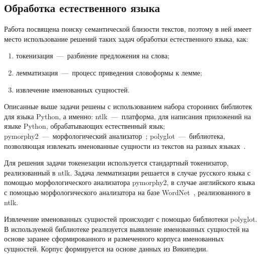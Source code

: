 \subsection{Обработка естественного языка}
\label{subsubsec:lemma}
    Работа посвящена поиску семантической близости текстов, поэтому в ней имеет место использование решений таких задач обработки естественного языка, как:
    \begin{enumerate}
        \item токенизация~---~разбиение предложения на слова;
        \item лемматизация~---~процесс приведения словоформы к лемме;
        \item извлечение именованных сущностей.
    \end{enumerate}
    Описанные выше задачи решены с использованием набора сторонних библиотек для языка Python, а именно:
    ntlk~---~платформа, для написания приложений на языке Python, обрабатывающих естественный язык;
    pymorphy2~---~морфологический анализатор~\cite{pymorphy};
    polyglot~---~библиотека, позволяющая извлекать именованные сущности из текстов на разных языках~\cite{polyglot}.

    Для решения задачи токенезации используется стандартный токенизатор, реализованный в ntlk.
    Задача лемматизации решается в случае русского языка с помощью морфологического анализатора pymorphy2,
    в случае английского языка с помощью морфологического анализатора на базе WordNet~\cite{wordnet}, реализованного в ntlk.

    Извлечение именованных сущностей происходит с помощью библиотеки polyglot.
    В используемой библиотеке реализуется выявление именованных сущностей на основе заранее сформированного и размеченного корпуса именованных сущностей.
    Корпус формируется на основе данных из Википедии.

